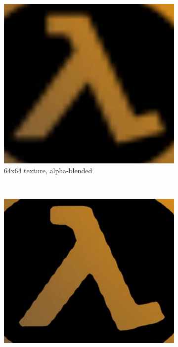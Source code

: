 \documentclass{article}
\begin{document}
\begin{figure}[!h]
    \centering
    \begin{subfigure}[b]{0.271\textwidth}
        \includegraphics[width=\textwidth]{Figs/ValveAlphaBlended.png}
        \caption{64x64 texture, alpha-blended}
        \label{fig:valveA}
    \end{subfigure}
    ~
    \begin{subfigure}[b]{0.3\textwidth}
        \includegraphics[width=\textwidth]{Figs/ValveAlphaTested.png}

\end{subfigure}
\end{figure}
\end{document}
